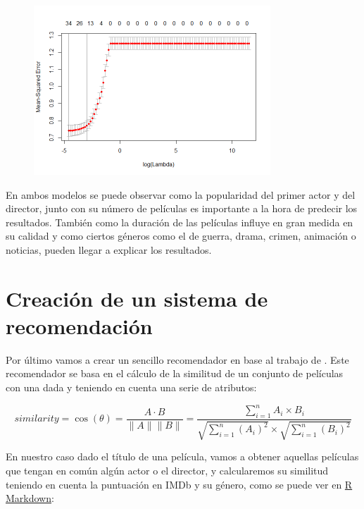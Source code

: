 \documentclass{article}
\begin{document}
\begin{figure}[h]
\centering
\includegraphics[width=3.5in,clip,keepaspectratio]{./model_supervised_files/figure-markdown_github/unnamed-chunk-7-1}
\end{figure}

En ambos modelos se puede observar como la popularidad del primer actor y del director, junto con su número de películas es importante a la hora de predecir los resultados. También como la duración de las películas influye en gran medida en su calidad y como ciertos géneros como el de guerra, drama, crimen, animación o noticias, pueden llegar a explicar los resultados.

\clearpage

\section{Creación de un sistema de recomendación}

Por último vamos a crear un sencillo recomendador en base al trabajo de \cite{recommender}. Este recomendador se basa en el cálculo de la similitud de un conjunto de películas con una dada y teniendo en cuenta una serie de atributos:

\begin{equation}
similarity = \cos(\theta) = \frac{A \cdot B}{\parallel A \parallel \parallel B \parallel} = \frac{\sum_{i=1}^{n} A_{i} \times B_{i}}{\sqrt{\sum_{i=1}^{n} (A_{i})^{2}} \times \sqrt{\sum_{i=1}^{n} (B_{i})^{2}}}
\end{equation}

En nuestro caso dado el título de una película, vamos a obtener aquellas películas que tengan en común algún actor o el director, y calcularemos su similitud teniendo en cuenta la puntuación en IMDb y su género, como se puede ver en \href{https://github.com/pozueco/proyecto_fin_de_master/blob/master/recommender.md}{R Markdown}:
\end{document}
